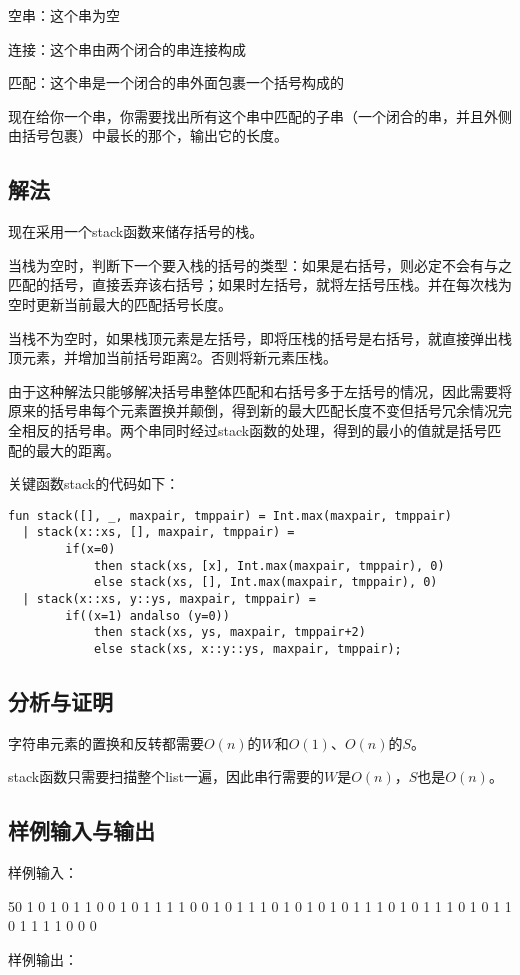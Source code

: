 \documentclass[UTF8,a4paperdui, %
]{ctexart}
\begin{document}
空串：这个串为空

连接：这个串由两个闭合的串连接构成

匹配：这个串是一个闭合的串外面包裹一个括号构成的

现在给你一个串，你需要找出所有这个串中匹配的子串（一个闭合的串，并且外侧由括号包裹）中最长的那个，输出它的长度。
\subsection{解法}
现在采用一个stack函数来储存括号的栈。

当栈为空时，判断下一个要入栈的括号的类型：如果是右括号，则必定不会有与之匹配的括号，直接丢弃该右括号；如果时左括号，就将左括号压栈。并在每次栈为空时更新当前最大的匹配括号长度。

当栈不为空时，如果栈顶元素是左括号，即将压栈的括号是右括号，就直接弹出栈顶元素，并增加当前括号距离2。否则将新元素压栈。

由于这种解法只能够解决括号串整体匹配和右括号多于左括号的情况，因此需要将原来的括号串每个元素置换并颠倒，得到新的最大匹配长度不变但括号冗余情况完全相反的括号串。两个串同时经过stack函数的处理，得到的最小的值就是括号匹配的最大的距离。

关键函数stack的代码如下：
\begin{lstlisting}
fun stack([], _, maxpair, tmppair) = Int.max(maxpair, tmppair)
  | stack(x::xs, [], maxpair, tmppair) = 
        if(x=0) 
            then stack(xs, [x], Int.max(maxpair, tmppair), 0)
            else stack(xs, [], Int.max(maxpair, tmppair), 0)
  | stack(x::xs, y::ys, maxpair, tmppair) = 
        if((x=1) andalso (y=0)) 
            then stack(xs, ys, maxpair, tmppair+2)
            else stack(xs, x::y::ys, maxpair, tmppair);
\end{lstlisting}
\subsection{分析与证明}
字符串元素的置换和反转都需要$O(n)$的$W$和$O(1)$、$O(n)$的$S$。

stack函数只需要扫描整个list一遍，因此串行需要的$W$是$O(n)$，$S$也是$O(n)$。
\subsection{样例输入与输出}
样例输入：

50 1 0 1 0 1 1 0 0 1 0 1 1 1 1 0 0 1 0 1 1 1 0 1 0 1 0 1 0 1 1 1 0 1 0 1 1 1 0 1 0 1 1 0 1 1 1 1 0 0 0

样例输出：
\end{document}
